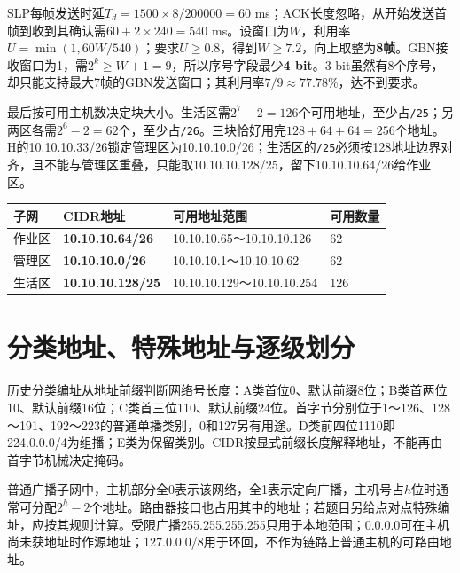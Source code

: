 SLP每帧发送时延\(T_d=1500\times8/200000=60\) ms；ACK长度忽略，从开始发送首帧到收到其确认需\(60+2\times240=540\) ms。设窗口为\(W\)，利用率\(U=\min(1,60W/540)\)；要求\(U\ge0.8\)，得到\(W\ge7.2\)，向上取整为\textbf{8帧}。GBN接收窗口为1，需\(2^k\ge W+1=9\)，所以序号字段最少\textbf{4 bit}。3 bit虽然有8个序号，却只能支持最大7帧的GBN发送窗口；其利用率\(7/9\approx77.78\%\)，达不到要求。

最后按可用主机数决定块大小。生活区需\(2^7-2=126\)个可用地址，至少占\texttt{/\allowbreak{}25}；另两区各需\(2^6-2=62\)个，至少占\texttt{/\allowbreak{}26}。三块恰好用完\(128+64+64=256\)个地址。H的10.10.10.33/26锁定管理区为10.10.10.0/26；生活区的\texttt{/\allowbreak{}25}必须按128地址边界对齐，且不能与管理区重叠，只能取10.10.10.128/25，留下10.10.10.64/26给作业区。

\begin{wideblock}

\par\medskip\noindent\begin{minipage}{\linewidth}\fontsize{9.3}{12}\selectfont\begin{tabularx}{\linewidth}{@{}YYYY@{}}
\toprule\noalign{}
子网 & CIDR地址 & 可用地址范围 & 可用数量 \\
\midrule\noalign{}


作业区 & \textbf{10.10.10.64/26} & 10.10.10.65～10.10.10.126 & 62 \\
管理区 & \textbf{10.10.10.0/26} & 10.10.10.1～10.10.10.62 & 62 \\
生活区 & \textbf{10.10.10.128/25} & 10.10.10.129～10.10.10.254 & 126 \\
\bottomrule\end{tabularx}
\end{minipage}\par\medskip

\end{wideblock}

\section{分类地址、特殊地址与逐级划分}\label{CN04-course-addresses}

历史分类编址从地址前缀判断网络号长度：A类首位0、默认前缀8位；B类首两位10、默认前缀16位；C类首三位110、默认前缀24位。首字节分别位于1～126、128～191、192～223的普通单播类别，0和127另有用途。D类前四位1110即224.0.0.0/4为组播；E类为保留类别。CIDR按显式前缀长度解释地址，不能再由首字节机械决定掩码。

普通广播子网中，主机部分全0表示该网络，全1表示定向广播，主机号占\(h\)位时通常可分配\(2^h-2\)个地址。路由器接口也占用其中的地址；若题目另给点对点特殊编址，应按其规则计算。受限广播255.255.255.255只用于本地范围；0.0.0.0可在主机尚未获地址时作源地址；127.0.0.0/8用于环回，不作为链路上普通主机的可路由地址。

